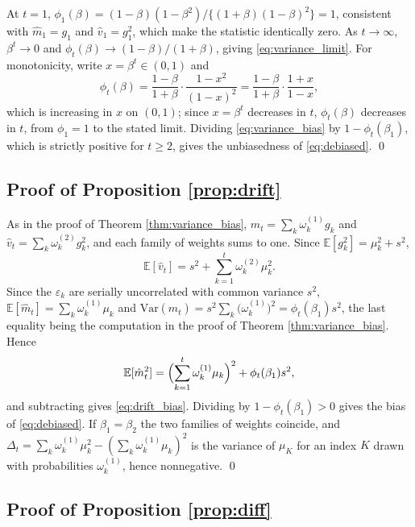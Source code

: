 \documentclass[a4paper,fleqn]{cas-sc}
\theoremstyle{plain}
\theoremstyle{definition}
\theoremstyle{remark}
\newenvironment{revblock}{}{}
\newcommand{\Var}{\mathrm{Var}}
\newcommand{\E}{\mathbb{E}}
\begin{document}
\begin{appendices}
At $t=1$, $\phi_1(\beta)=(1-\beta)(1-\beta^2)/\{(1+\beta)(1-\beta)^2\}=1$, consistent with $\hat m_1=g_1$ and $\hat v_1=g_1^2$, which make the statistic identically zero. As $t\to\infty$, $\beta^t\to0$ and $\phi_t(\beta)\to(1-\beta)/(1+\beta)$, giving \eqref{eq:variance_limit}. For monotonicity, write $x=\beta^{t}\in(0,1)$ and
\begin{equation}
\phi_t(\beta)=\frac{1-\beta}{1+\beta}\cdot\frac{1-x^{2}}{(1-x)^{2}}
=\frac{1-\beta}{1+\beta}\cdot\frac{1+x}{1-x},
\end{equation}
which is increasing in $x$ on $(0,1)$; since $x=\beta^{t}$ decreases in $t$, $\phi_t(\beta)$ decreases in $t$, from $\phi_1=1$ to the stated limit. Dividing \eqref{eq:variance_bias} by $1-\phi_t(\beta_1)$, which is strictly positive for $t\ge2$, gives the unbiasedness of \eqref{eq:debiased}. \qed

\subsection*{Proof of Proposition \ref{prop:drift}}

As in the proof of Theorem \ref{thm:variance_bias}, $\hat m_t=\sum_k\omega^{(1)}_kg_k$ and $\hat v_t=\sum_k\omega^{(2)}_kg^2_k$, and each family of weights sums to one. Since $\E[g^2_k]=\mu^2_k+s^2$,
\begin{equation}
\E[\hat v_t]=s^2+\sum_{k=1}^{t}\omega^{(2)}_k\mu^2_k .
\end{equation}
Since the $\varepsilon_k$ are serially uncorrelated with common variance $s^2$, $\E[\hat m_t]=\sum_k\omega^{(1)}_k\mu_k$ and $\Var(\hat m_t)=s^2\sum_k\bigl(\omega^{(1)}_k\bigr)^2=\phi_t(\beta_1)s^2$, the last equality being the computation in the proof of Theorem \ref{thm:variance_bias}. Hence
\begin{equation}
\E[\hat m^2_t]=\Bigl(\sum_{k=1}^{t}\omega^{(1)}_k\mu_k\Bigr)^{2}+\phi_t(\beta_1)s^2 ,
\end{equation}
and subtracting gives \eqref{eq:drift_bias}. Dividing by $1-\phi_t(\beta_1)>0$ gives the bias of \eqref{eq:debiased}. If $\beta_1=\beta_2$ the two families of weights coincide, and $\Delta_t=\sum_k\omega^{(1)}_k\mu^2_k-(\sum_k\omega^{(1)}_k\mu_k)^2$ is the variance of $\mu_K$ for an index $K$ drawn with probabilities $\omega^{(1)}_k$, hence nonnegative. \qed

\subsection*{Proof of Proposition \ref{prop:diff}}


\end{appendices}
\end{document}
